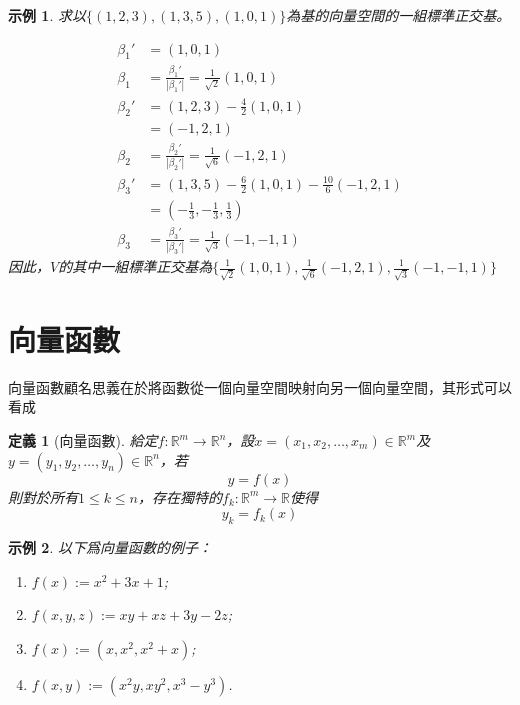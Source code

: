 \documentclass[12pt]{article}
\newtheorem{definition}{定義}
\newtheorem*{example}{示例}
\begin{document}
    \begin{example}
        求以$\{(1,2,3),(1,3,5),(1,0,1)\}$為基的向量空間的一組標準正交基。

        \begin{align*}
            \beta_1'&=(1,0,1)\\
            \beta_1&=\frac{\beta_1'}{|\beta_1'|}=\frac{1}{\sqrt{2}}(1,0,1)\\
            \beta_2'&=(1,2,3)-\frac{4}{2}(1,0,1)\\
            &=(-1,2,1)\\
            \beta_2&=\frac{\beta_2'}{|\beta_2'|}=\frac{1}{\sqrt{6}}(-1,2,1)\\
            \beta_3'&=(1,3,5)-\frac{6}{2}(1,0,1)-\frac{10}{6}(-1,2,1)\\
            &=(-\frac{1}{3},-\frac{1}{3},\frac{1}{3})\\
            \beta_3&=\frac{\beta_3'}{|\beta_3'|}=\frac{1}{\sqrt{3}}(-1,-1,1)
        \end{align*}
        因此，$V$的其中一組標準正交基為$\{\frac{1}{\sqrt{2}}(1,0,1),\frac{1}{\sqrt{6}}(-1,2,1),\frac{1}{\sqrt{3}}(-1,-1,1)\}$
    \end{example}

    \section*{向量函數}

    向量函數顧名思義在於將函數從一個向量空間映射向另一個向量空間，其形式可以看成

    \begin{definition}[向量函數]
        給定$f:\mathbb{R}^m\to\mathbb{R}^n$，設$x=(x_1,x_2,\dots,x_m)\in\mathbb{R}^m$及$y=(y_1,y_2,\dots,y_n)\in\mathbb{R}^n$，若$$y=f(x)$$則對於所有$1\leq k\leq n$，存在獨特的$f_k:\mathbb{R}^m\to\mathbb{R}$使得$$y_k=f_k(x)$$
    \end{definition}

    \begin{example}
        以下爲向量函數的例子：\begin{enumerate}
            \item $f(x):=x^2+3x+1$;
            \item $f(x,y,z):=xy+xz+3y-2z$;
            \item $f(x):=(x,x^2,x^2+x)$;
            \item $f(x,y):=(x^2y,xy^2,x^3-y^3)$.
        \end{enumerate}
    \end{example}
\end{document}
